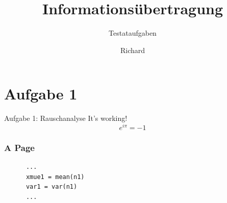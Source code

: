 \documentclass[aspectratio=1610]{beamer}
\title{Informationsübertragung}
\subtitle{Testataufgaben}
\author{Richard \color{hsblue}{\textsc{Grünert}}}
\institute{Hochschule Wismar}
\begin{document}
  {%
    \frame{\titlepage}
  }

  \section{Aufgabe 1}
  \begin{frame}{Aufgabe 1: Rauschanalyse}
    It's working!
    \[e^{i \pi} = -1\]
  \end{frame}

  \begin{frame}[fragile]
    \frametitle{A Page}
    \begin{lstlisting}
      ...
      xmue1 = mean(n1)
      var1 = var(n1)
      ...
      \end{lstlisting}
  \end{frame}

  
\end{document}
